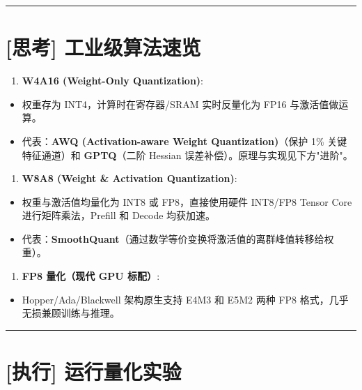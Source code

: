 \vspace{0.8em}\hrule\vspace{0.8em}

\section{[思考] 工业级算法速览}

\begin{enumerate}
  \item \textbf{W4A16 (Weight-Only Quantization)}:
\end{enumerate}

\begin{itemize}
  \item 权重存为 INT4，计算时在寄存器/SRAM 实时反量化为 FP16 与激活值做运算。
  \item 代表：\textbf{AWQ (Activation-aware Weight Quantization)}（保护 1\% 关键特征通道）和 \textbf{GPTQ}（二阶 Hessian 误差补偿）。原理与实现见下方"进阶"。
\end{itemize}

\begin{enumerate}
  \item \textbf{W8A8 (Weight \& Activation Quantization)}:
\end{enumerate}

\begin{itemize}
  \item 权重与激活值均量化为 INT8 或 FP8，直接使用硬件 INT8/FP8 Tensor Core 进行矩阵乘法，Prefill 和 Decode 均获加速。
  \item 代表：\textbf{SmoothQuant}（通过数学等价变换将激活值的离群峰值转移给权重）。
\end{itemize}

\begin{enumerate}
  \item \textbf{FP8 量化（现代 GPU 标配）}:
\end{enumerate}

\begin{itemize}
  \item Hopper/Ada/Blackwell 架构原生支持 E4M3 和 E5M2 两种 FP8 格式，几乎无损兼顾训练与推理。
\end{itemize}

\vspace{0.8em}\hrule\vspace{0.8em}

\section{[执行] 运行量化实验}

